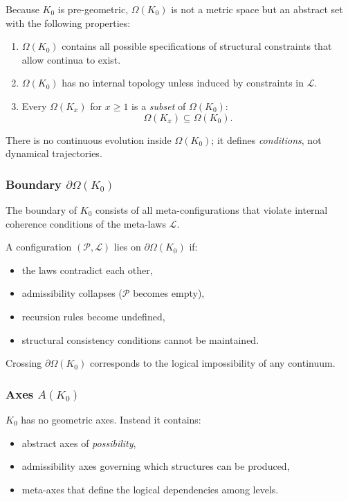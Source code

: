 Because $K_0$ is pre-geometric, $\Omega(K_0)$ is not a metric space but
an abstract set with the following properties:
\begin{enumerate}
    \item $\Omega(K_0)$ contains all possible specifications of
          structural constraints that allow continua to exist.
    \item $\Omega(K_0)$ has no internal topology unless induced by
          constraints in $\mathcal{L}$.
    \item Every $\Omega(K_x)$ for $x \ge 1$ is a \emph{subset} of
          $\Omega(K_0)$:
          \[
              \Omega(K_x) \subseteq \Omega(K_0).
          \]
\end{enumerate}

There is no continuous evolution inside $\Omega(K_0)$; it defines
\emph{conditions}, not dynamical trajectories.

\subsubsection{Boundary \texorpdfstring{$\partial\Omega(K_0)$}{\partial\Omega(K_0)}}

The boundary of $K_0$ consists of all meta-configurations that violate
internal coherence conditions of the meta-laws $\mathcal{L}$.

A configuration $(\mathcal{P},\mathcal{L})$ lies on $\partial\Omega(K_0)$ if:
\begin{itemize}
    \item the laws contradict each other,
    \item admissibility collapses ($\mathcal{P}$ becomes empty),
    \item recursion rules become undefined,
    \item structural consistency conditions cannot be maintained.
\end{itemize}

Crossing $\partial\Omega(K_0)$ corresponds to the logical impossibility 
of any continuum.

\subsubsection{Axes \texorpdfstring{$A(K_0)$}{A(K_0)}}

$K_0$ has no geometric axes. Instead it contains:
\begin{itemize}
    \item abstract axes of \emph{possibility},
    \item admissibility axes governing which structures can be produced,
    \item meta-axes that define the logical dependencies among levels.
\end{itemize}

